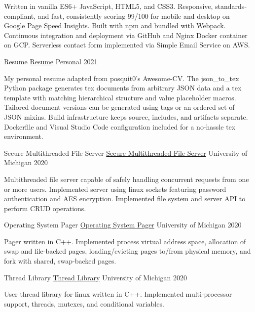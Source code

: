 \documentclass[11pt, a4paper]{cv}
\newenvironment{projects}{}{\par}
\newenvironment{cv}{}{\par}
\begin{document}
\begin{cv}
\begin{projects}
\begin{cventries}
{}
{}
{}
{\begin{cvparagraph}
Written in vanilla ES6+ JavaScript, HTML5, and CSS3. Responsive, standards-compliant, and fast, consistently scoring 99/100 for mobile and desktop on Google Page Speed Insights. Built with npm and bundled with Webpack. Continuous integration and deployment via GitHub and Nginx Docker container on GCP. Serverless contact form implemented via Simple Email Service on AWS.
\end{cvparagraph}}
\cventrycompact
{
{Resume}
{\color{hrefblue}\href{https://github.com/brandonmosher/resume}{Resume}}}
{}
{Personal}
{2021}
{\begin{cvparagraph}
My personal resume adapted from posquit0's Awesome-CV. The json\_to\_tex Python package generates tex documents from arbitrary JSON data and a tex template with matching hierarchical structure and value placeholder macros. Tailored document versions can be generated using tags or an ordered set of JSON mixins. Build infrastructure keeps source, includes, and artifacts separate. Dockerfile and Visual Studio Code configuration included for a no-hassle tex environment.
\end{cvparagraph}}
\cventrycompact
{\ifstrempty{}
{Secure Multithreaded File Server}
{\color{hrefblue}\href{}{Secure Multithreaded File Server}}}
{}
{University of Michigan}
{2020}
{\begin{cvparagraph}
Multithreaded file server capable of safely handling concurrent requests from one or more users. Implemented server using linux sockets featuring password authentication and AES encryption. Implemented file system and server API to perform CRUD operations.
\end{cvparagraph}}
\cventrycompact
{\ifstrempty{}
{Operating System Pager}
{\color{hrefblue}\href{}{Operating System Pager}}}
{}
{University of Michigan}
{2020}
{\begin{cvparagraph}
Pager written in C++. Implemented process virtual address space, allocation of swap and file-backed pages, loading/evicting pages to/from physical memory, and fork with shared, swap-backed pages.
\end{cvparagraph}}
\cventrycompact
{\ifstrempty{}
{Thread Library}
{\color{hrefblue}\href{}{Thread Library}}}
{}
{University of Michigan}
{2020}
{\begin{cvparagraph}
User thread library for linux written in C++. Implemented multi-processor support, threads, mutexes, and conditional variables.
\end{cvparagraph}}

\end{cventries}
\end{projects}
\end{cv}
\end{document}
